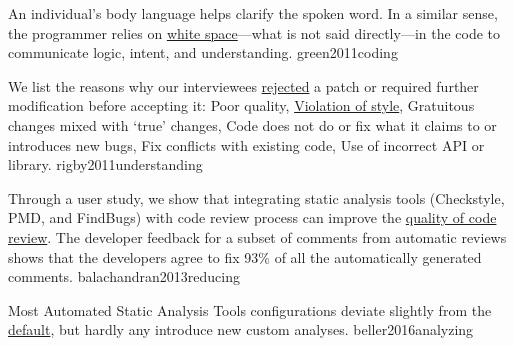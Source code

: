 \documentclass{article}
\begin{document}
  {An individual's body language helps clarify the spoken word. In a similar sense, the programmer relies on \ul{white space}---what is not said directly---in the code to communicate logic, intent, and understanding.}
  {green2011coding}

  {We list the reasons why our interviewees \ul{rejected} a patch or required further modification before accepting it:
    Poor quality,
    \ul{Violation of style},
    Gratuitous changes mixed with `true' changes,
    Code does not do or fix what it claims to or introduces new bugs,
    Fix conflicts with existing code,
    Use of incorrect API or library.}
  {rigby2011understanding}

  {Through a user study, we show that integrating static analysis tools (Checkstyle, PMD, and FindBugs) with code review process can improve the \ul{quality of code review}. The developer feedback for a subset of comments from automatic reviews shows that the developers agree to fix 93\% of all the automatically generated comments.}
  {balachandran2013reducing}

  {Most Automated Static Analysis Tools configurations deviate slightly from the \ul{default}, but hardly any introduce new custom analyses. }
  {beller2016analyzing}
\end{document}
